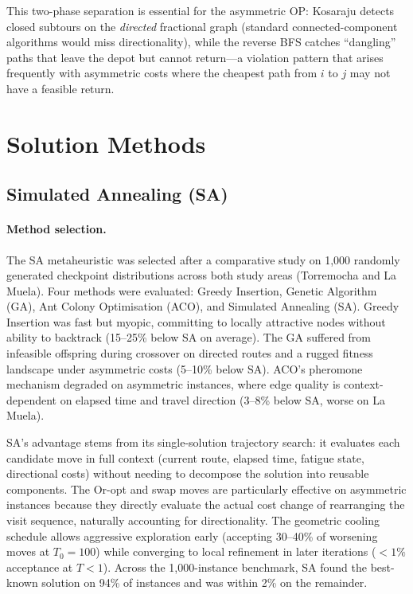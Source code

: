 \documentclass[11pt,a4paper]{article}
\begin{document}
This two-phase separation is essential for the asymmetric OP: Kosaraju detects closed subtours on the \emph{directed} fractional graph (standard connected-component algorithms would miss directionality), while the reverse BFS catches ``dangling'' paths that leave the depot but cannot return---a violation pattern that arises frequently with asymmetric costs where the cheapest path from $i$ to $j$ may not have a feasible return.

\section{Solution Methods}
\label{sec:methods}

\subsection{Simulated Annealing (SA)}
\label{sec:sa}

\paragraph{Method selection.}
The SA metaheuristic was selected after a comparative study on 1{,}000 randomly generated checkpoint distributions across both study areas (Torremocha and La Muela).
Four methods were evaluated: Greedy Insertion, Genetic Algorithm (GA), Ant Colony Optimisation (ACO), and Simulated Annealing (SA).
Greedy Insertion was fast but myopic, committing to locally attractive nodes without ability to backtrack (15--25\% below SA on average).
The GA suffered from infeasible offspring during crossover on directed routes and a rugged fitness landscape under asymmetric costs (5--10\% below SA).
ACO's pheromone mechanism degraded on asymmetric instances, where edge quality is context-dependent on elapsed time and travel direction (3--8\% below SA, worse on La Muela).

SA's advantage stems from its single-solution trajectory search: it evaluates each candidate move in full context (current route, elapsed time, fatigue state, directional costs) without needing to decompose the solution into reusable components.
The Or-opt and swap moves are particularly effective on asymmetric instances because they directly evaluate the actual cost change of rearranging the visit sequence, naturally accounting for directionality.
The geometric cooling schedule allows aggressive exploration early (accepting 30--40\% of worsening moves at $T_0 = 100$) while converging to local refinement in later iterations ($< 1\%$ acceptance at $T < 1$).
Across the 1{,}000-instance benchmark, SA found the best-known solution on 94\% of instances and was within 2\% on the remainder.
\end{document}
